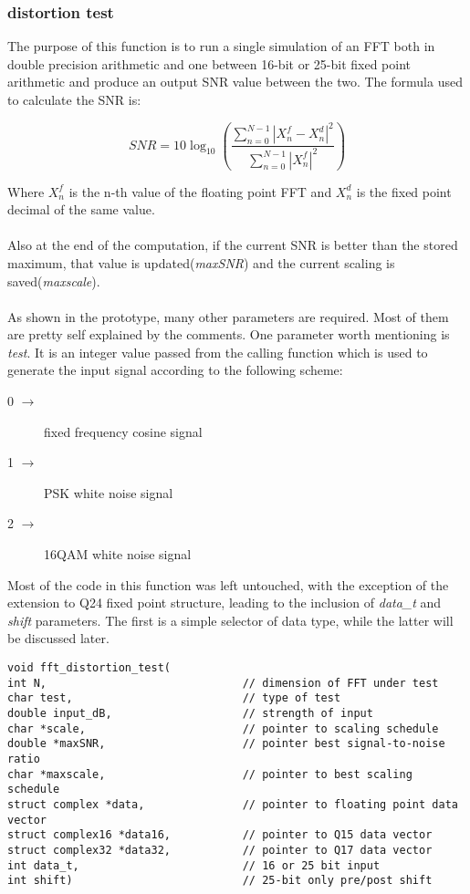\documentclass[a4paper]{article}
\begin{document}
\subsubsection{distortion test}
The purpose of this function is to run a single simulation of an FFT both in double precision arithmetic and one between 16-bit or 25-bit fixed point arithmetic and produce an output SNR value between the two.
The formula used to calculate the SNR is:

$$\mathit{SNR} = 10\log_{10}{\left(\frac{\sum_{n=0}^{N-1}{|X_n^f - X_n^d|^2}}{\sum_{n=0}^{N-1}{|X_n^f|^2}}\right)}$$

Where $X_n^f$ is the n-th value of the floating point FFT and $X_n^d$ is the fixed point decimal of the same value.\\\\
Also at the end of the computation, if the current SNR is better than the stored maximum, that value is updated(\textit{maxSNR}) and the current scaling is saved(\textit{maxscale}).\\\\
As shown in the prototype, many other parameters are required. Most of them are pretty self explained by the comments.
One parameter worth mentioning is \textit{test}. It is an integer value passed from the calling function which is used to generate the input signal according to the following scheme:
\begin{description}
	\item[0 $\rightarrow$] fixed frequency cosine signal
	\item[1 $\rightarrow$] PSK white noise signal
	\item[2 $\rightarrow$] 16QAM white noise signal
\end{description}

Most of the code in this function was left untouched, with the exception of the extension to Q24 fixed point structure, leading to the inclusion of \textit{data\_t} and \textit{shift} parameters.
The first is a simple selector of data type, while the latter will be discussed later.

\begin{lstlisting}
void fft_distortion_test(
int N,                              // dimension of FFT under test 
char test,                          // type of test
double input_dB,                    // strength of input
char *scale,                        // pointer to scaling schedule
double *maxSNR,                     // pointer best signal-to-noise ratio
char *maxscale,                     // pointer to best scaling schedule
struct complex *data,               // pointer to floating point data vector
struct complex16 *data16,           // pointer to Q15 data vector
struct complex32 *data32,           // pointer to Q17 data vector
int data_t,                         // 16 or 25 bit input
int shift)                          // 25-bit only pre/post shift

\end{lstlisting}
\end{document}
